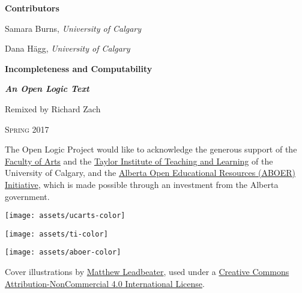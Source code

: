 \textbf{\color{leadbeater}Contributors}

\medskip

Samara Burns, \emph{University of Calgary}

Dana H\"agg, \emph{University of Calgary}

\newpage


\vspace*{100pt}

\begin{raggedleft}

{\fontsize{24pt}{24pt}\selectfont\bfseries\sffamily%
  Incompleteness and Computability}

\smallskip

{\fontsize{18pt}{18pt}\selectfont\bfseries\itshape An Open Logic Text}

\vspace{100pt}

\fontsize{14pt}{14pt}\selectfont Remixed by Richard Zach

\vfill

\textsc{Spring 2017} %

\end{raggedleft}


\newpage


\noindent
The Open Logic Project would like to acknowledge the generous support
of the \href{http://arts.ucalgary.ca/}{Faculty of Arts} and
the \href{http://www.ucalgary.ca/taylorinstitute/}{Taylor Institute of
Teaching and Learning} of the University of Calgary,
and the \href{http://albertaoer.com}{Alberta Open Educational Resources
(ABOER) Initiative}, which is made possible through an investment from
the Alberta government.



\bigskip

\noindent\texttt{[image: assets/ucarts-color]}

\medskip

\noindent\texttt{[image: assets/ti-color]}

\medskip

\noindent\texttt{[image: assets/aboer-color]}

\vfill

\noindent Cover illustrations by \href{http://mattleadbeater.com}{Matthew
  Leadbeater}, used under a
\href{http://creativecommons.org/licenses/by-nc/4.0/}{Creative Commons
  Attribution-NonCommercial 4.0 International License}.

